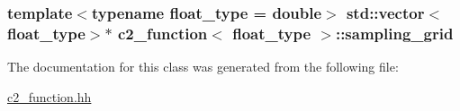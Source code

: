 \subsubsection[{\texorpdfstring{sampling\+\_\+grid}{sampling_grid}}]{\setlength{\rightskip}{0pt plus 5cm}template$<$typename float\+\_\+type = double$>$ std\+::vector$<$float\+\_\+type$>$$\ast$ {\bf c2\+\_\+function}$<$ float\+\_\+type $>$\+::sampling\+\_\+grid\hspace{0.3cm}{\ttfamily [protected]}}\hypertarget{classc2__function_ad9714faf2c3d053a77fd733b52834754}{}\label{classc2__function_ad9714faf2c3d053a77fd733b52834754}


The documentation for this class was generated from the following file\+:\begin{DoxyCompactItemize}
\item 
\hyperlink{c2__function_8hh}{c2\+\_\+function.\+hh}\end{DoxyCompactItemize}

